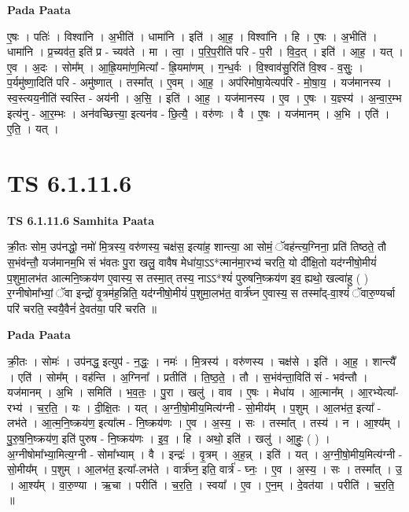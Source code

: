 \documentclass[17pt]{extarticle}
\begin{document}
\textbf{Pada Paata} \newline

ए॒षः । पतिः॑ । विश्वा॑नि । अ॒भीति॑ । धामा॑नि । इति॑ । आ॒ह॒ । विश्वा॑नि । हि । ए॒षः । अ॒भीति॑ । धामा॑नि । प्र॒च्यव॑त॒ इति॑ प्र - च्यव॑ते । मा । त्वा॒ । प॒रि॒प॒रीति॑ परि - प॒री । वि॒द॒त् । इति॑ । आ॒ह॒ । यत् । ए॒व । अ॒दः । सोम᳚म् । आ॒ह्रि॒यमा॑ण॒मित्या᳚ - ह्रि॒यमा॑णम् । ग॒न्ध॒र्वः । वि॒श्वाव॑सु॒रिति॑ वि॒श्व - व॒सुः॒ । प॒र्यमु॑ष्णा॒दिति॑ परि - अमु॑ष्णात् । तस्मा᳚त् । ए॒वम् । आ॒ह॒ । अप॑रिमोषा॒येत्यप॑रि - मो॒षा॒य॒ । यज॑मानस्य । स्व॒स्त्यय॒नीति॑ स्वस्ति - अय॑नी । अ॒सि॒ । इति॑ । आ॒ह॒ । यज॑मानस्य । ए॒व । ए॒षः । य॒ज्ञ्स्य॑ । अ॒न्वा॒र॒म्भ इत्य॑नु - आ॒र॒म्भः । अन॑वच्छित्त्या॒ इत्यन॑व - छि॒त्यै॒ । वरु॑णः । वै । ए॒षः । यज॑मानम् । अ॒भि । एति॑ । ए॒ति॒ । यत् ।  \newline




\section*{ TS 6.1.11.6 }

\textbf{TS 6.1.11.6 } \newline
\textbf{Samhita Paata} \newline

क्री॒तः सोम॒ उप॑नद्धो॒ नमो॑ मि॒त्रस्य॒ वरु॑णस्य॒ चक्ष॑स॒ इत्या॑ह॒ शान्त्या॒ आ सोमं॒ ॅवह॑न्त्य॒ग्निना॒ प्रति॑ तिष्ठते॒ तौ स॒भंव॑न्तौ॒ यज॑मानम॒भि सं भ॑वतः पु॒रा खलु॒ वावैष मेधा॑या॒ऽऽ*त्मान॑मा॒रभ्य॑ चरति॒ यो दी᳚क्षि॒तो यद॑ग्नीषो॒मीयं॑ प॒शुमा॒लभ॑त आत्मनि॒ष्क्रय॑ण ए॒वास्य॒ स तस्मा॒त् तस्य॒ नाऽऽ*श्यं॑ पुरुषनि॒ष्क्रय॑ण इव॒ ह्यथो॒ खल्वा॑हु ( ) र॒ग्नीषोमा᳚भ्यां॒ ॅवा इन्द्रो॑ वृ॒त्रम॑ह॒न्निति॒ यद॑ग्नीषो॒मीयं॑ प॒शुमा॒लभ॑त॒ वार्त्र॑घ्न ए॒वास्य॒ स तस्मा᳚द्-वा॒श्यं॑ ॅवारु॒ण्यर्चा परि॑ चरति॒ स्वयै॒वैनं॑ दे॒वत॑या॒ परि॑ चरति ॥ \newline

\textbf{Pada Paata} \newline

क्री॒तः । सोमः॑ । उप॑नद्ध॒ इत्युप॑ - न॒द्धः॒ । नमः॑ । मि॒त्रस्य॑ । वरु॑णस्य । चक्ष॑से । इति॑ । आ॒ह॒ । शान्त्यै᳚ । एति॑ । सोम᳚म् । वह॑न्ति । अ॒ग्निना᳚ । प्रतीति॑ । ति॒ष्ठ॒ते॒ । तौ । स॒भंव॑न्ता॒विति॑ सं - भव॑न्तौ । यज॑मानम् । अ॒भि । समिति॑ । भ॒व॒तः॒ । पु॒रा । खलु॑ । वाव । ए॒षः । मेधा॑य । आ॒त्मान᳚म् । आ॒रभ्येत्या᳚-रभ्य॑ । च॒र॒ति॒ । यः । दी॒क्षि॒तः । यत् । अ॒ग्नी॒षो॒मीय॒मित्य॑ग्नी - सो॒मीय᳚म् । प॒शुम् । आ॒लभ॑त॒ इत्या᳚ - लभ॑ते । आ॒त्म॒नि॒ष्क्रय॑ण॒ इत्या᳚त्म - नि॒ष्क्रय॑णः । ए॒व । अ॒स्य॒ । सः । तस्मा᳚त् । तस्य॑ । न । आ॒श्य᳚म् । पु॒रु॒ष॒नि॒ष्क्रय॑ण॒ इति॑ पुरुष - नि॒ष्क्रय॑णः । इ॒व॒ । हि । अथो॒ इति॑ । खलु॑ । आ॒हुः॒ ( ) । अ॒ग्नीषोमा᳚भ्या॒मित्य॒ग्नी - सोमा᳚भ्याम् । वै । इन्द्रः॑ । वृ॒त्रम् । अ॒ह॒न्न् । इति॑ । यत् । अ॒ग्नी॒षो॒मीय॒मित्य॑ग्नी - सो॒मीय᳚म् । प॒शुम् । आ॒लभ॑त॒ इत्या᳚-लभ॑ते । वार्त्र॑घ्न॒ इति॒ वार्त्र॑ - घ्नः॒ । ए॒व । अ॒स्य॒ । सः । तस्मा᳚त् । उ॒ । आ॒श्य᳚म् । वा॒रु॒ण्या । ऋ॒चा । परीति॑ । च॒र॒ति॒ । स्वया᳚ । ए॒व । ए॒न॒म् । दे॒वत॑या । परीति॑ । च॒र॒ति॒ ॥  \newline
\end{document}
